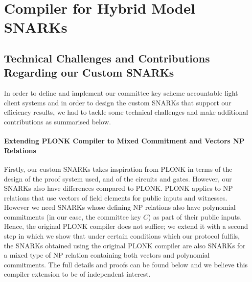 \section{Compiler for Hybrid Model SNARKs}
\label{sec_two_step_compiler}
\subsection{Technical Challenges and Contributions Regarding our Custom SNARKs} 
\label{sec:technical_challenges}

In order to define and implement our committee key scheme accountable light client systems and in order to design the custom SNARKs that support our efficiency results, 
we had to tackle some technical challenges and make additional contributions as summarised below.

\paragraph{Extending PLONK Compiler to Mixed Commitment and Vectors NP Relations} Firstly, our custom SNARKs takes inspiration from PLONK \cite{plonk} in terms of the design of the proof system used, and of the circuits and gates. However, our SNARKs also have differences compared to PLONK. PLONK applies to NP relations  that use  vectors of field elements for 
public inputs and witnesses.  However we need SNARKs whose defining NP relations also have  polynomial commitments (in our case, the committee key $C$) as part of their public inputs. Hence, the original PLONK compiler does not suffice; we extend it with a second step in which we show that under certain conditions which our protocol fulfils, the SNARKs obtained using the original PLONK compiler are also SNARKs for a mixed type of NP relation containing both vectors and polynomial commitments. The full details and proofs can be found below and we believe this compiler extension to be of independent interest. 


